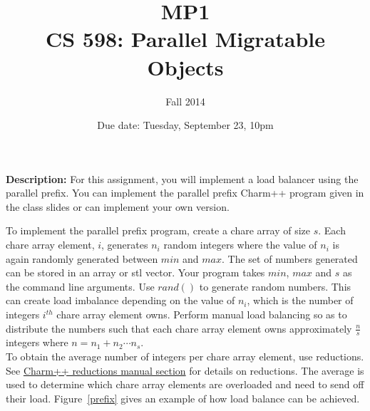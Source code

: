 \documentclass{article}
\title{MP1 \\ CS 598: Parallel Migratable Objects}
\author{Fall 2014}
\date{Due date: Tuesday, September 23, 10pm}
\begin{document}
\maketitle

\textbf{Description:} 
For this assignment, you will implement a load balancer using the parallel
prefix. You can implement the parallel prefix Charm++ program given in the class
slides or can implement your own version. 


To implement the parallel prefix program, create a chare array of size $s$. Each
chare array element, $i$, generates $n_i$ random integers where the value of
$n_i$ is again randomly generated between $min$ and $max$. The set of numbers generated
can be stored in an array or stl vector. Your program takes $min$,
$max$ and $s$ as the command line arguments. Use $rand()$ to generate random
numbers. This can create load imbalance depending on the value of $n_i$, which is
the number of integers $i^{th}$ chare array element owns. Perform manual load
balancing so as to distribute the numbers such that each chare array element owns
approximately  $\frac{n}{s}$ integers where  $n = n_1 + n_2 \cdots n_s$.\\




To obtain the average number of integers per chare array element, use
reductions. See
\href{http://charm.cs.uiuc.edu/manuals/html/charm++/4.html#SECTION01361000000000000000}{Charm++
reductions manual section} for details on reductions. The average is used to
determine which chare array elements are overloaded and need to send off their
load. Figure~\ref{prefix} gives an example of how load balance can be achieved. 
\end{document}
